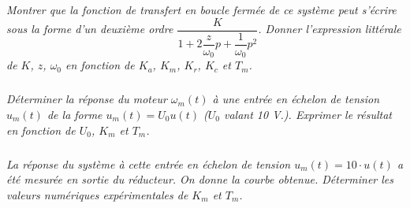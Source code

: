 \documentclass[11pt,oneside]{article}
\begin{document}
\subparagraph{}
\textit{Montrer que la fonction de transfert en boucle fermée de ce système peut s'écrire sous la forme d'un deuxième ordre $\dfrac{K}{1+2\dfrac{z}{\omega_0}p+\dfrac{1}{\omega_0}p^2}$. Donner l'expression littérale de $K$, $z$, $\omega_0$ en fonction de $K_a$, $K_m$, $K_r$, $K_c$ et $T_m$.}


\subparagraph{}
\textit{Déterminer la réponse du moteur $\omega_m(t)$ à une entrée en échelon de tension $u_m(t)$ de la forme $u_m(t)=U_0 u(t)$ ($U_0$ valant 10 V.). Exprimer le résultat en fonction de $U_0$, $K_m$ et $T_m$.}


\subparagraph{}
\textit{La réponse du système à cette entrée en échelon de tension $u_m(t)=10\cdot u(t)$ a été mesurée en sortie du réducteur. On donne la courbe obtenue. Déterminer les valeurs numériques expérimentales de $K_m$ et $T_m$.} %
\end{document}
